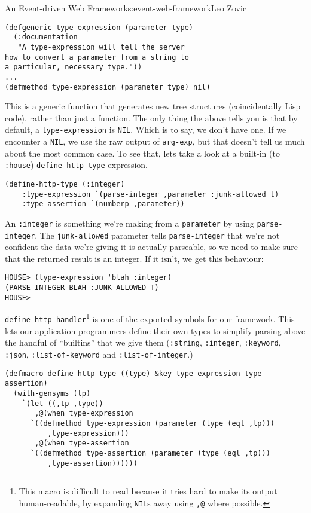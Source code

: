 \begin{aosachapter}{An Event-driven Web Framework}{s:event-web-framework}{Leo Zovic}
\label{type-expression}

\begin{verbatim}
(defgeneric type-expression (parameter type)
  (:documentation
   "A type-expression will tell the server
how to convert a parameter from a string to
a particular, necessary type."))
...
(defmethod type-expression (parameter type) nil)
\end{verbatim}

This is a generic function that generates new tree structures
(coincidentally Lisp code), rather than just a function. The only thing
the above tells you is that by default, a \texttt{type-expression} is
\texttt{NIL}. Which is to say, we don't have one. If we encounter a
\texttt{NIL}, we use the raw output of \texttt{arg-exp}, but that
doesn't tell us much about the most common case. To see that, lets take
a look at a built-in (to \texttt{:house}) \texttt{define-http-type}
expression.

\begin{verbatim}
(define-http-type (:integer)
    :type-expression `(parse-integer ,parameter :junk-allowed t)
    :type-assertion `(numberp ,parameter))
\end{verbatim}

An \texttt{:integer} is something we're making from a \texttt{parameter}
by using \texttt{parse-integer}. The \texttt{junk-allowed} parameter
tells \texttt{parse-integer} that we're not confident the data we're
giving it is actually parseable, so we need to make sure that the
returned result is an integer. If it isn't, we get this behaviour:

\begin{verbatim}
HOUSE> (type-expression 'blah :integer)
(PARSE-INTEGER BLAH :JUNK-ALLOWED T)
HOUSE>
\end{verbatim}

\texttt{define-http-handler}\footnote{This macro is difficult to read
  because it tries hard to make its output human-readable, by expanding
  \texttt{NIL}s away using \texttt{,@} where possible.} is one of the
exported symbols for our framework. This lets our application
programmers define their own types to simplify parsing above the handful
of ``builtins'' that we give them (\texttt{:string}, \texttt{:integer},
\texttt{:keyword}, \texttt{:json}, \texttt{:list-of-keyword} and
\texttt{:list-of-integer}.)

\begin{verbatim}
(defmacro define-http-type ((type) &key type-expression type-assertion)
  (with-gensyms (tp)
    `(let ((,tp ,type))
       ,@(when type-expression
      `((defmethod type-expression (parameter (type (eql ,tp)))
          ,type-expression)))
       ,@(when type-assertion
      `((defmethod type-assertion (parameter (type (eql ,tp)))
          ,type-assertion))))))
\end{verbatim}


\end{aosachapter}
